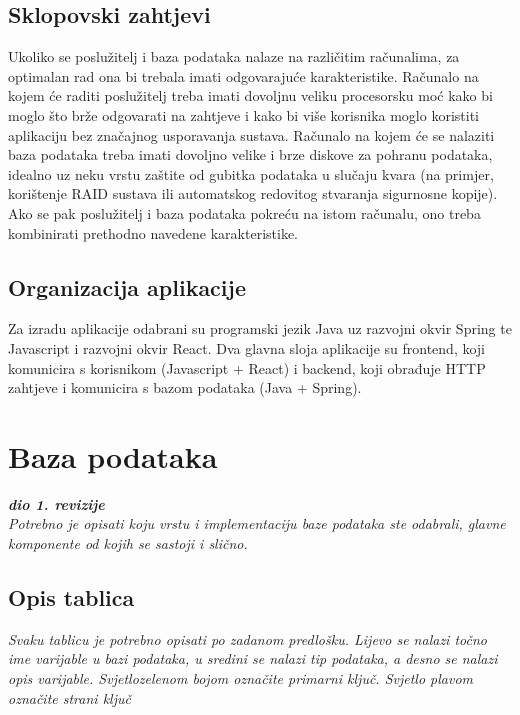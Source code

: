 			\subsection{Sklopovski zahtjevi}
				Ukoliko se poslužitelj i baza podataka nalaze na različitim računalima, za optimalan rad ona bi trebala imati odgovarajuće karakteristike. Računalo na kojem će raditi poslužitelj treba imati dovoljnu veliku procesorsku moć kako bi moglo što brže odgovarati na zahtjeve i kako bi više korisnika moglo koristiti aplikaciju bez značajnog usporavanja sustava. Računalo na kojem će se nalaziti baza podataka treba imati dovoljno velike i brze diskove za pohranu podataka, idealno uz neku vrstu zaštite od gubitka podataka u slučaju kvara (na primjer, korištenje RAID sustava ili automatskog redovitog stvaranja sigurnosne kopije). Ako se pak poslužitelj i baza podataka pokreću na istom računalu, ono treba kombinirati prethodno navedene karakteristike.
			\subsection{Organizacija aplikacije}
				Za izradu aplikacije odabrani su programski jezik Java uz razvojni okvir Spring te Javascript i razvojni okvir React. Dva glavna sloja aplikacije su frontend, koji komunicira s korisnikom (Javascript + React) i backend, koji obrađuje HTTP zahtjeve i komunicira s bazom podataka (Java + Spring).
				
				
		

		\section{Baza podataka}
			
			\textbf{\textit{dio 1. revizije}}\\
			
		\textit{Potrebno je opisati koju vrstu i implementaciju baze podataka ste odabrali, glavne komponente od kojih se sastoji i slično.}
		
			\subsection{Opis tablica}
			

				\textit{Svaku tablicu je potrebno opisati po zadanom predlošku. Lijevo se nalazi točno ime varijable u bazi podataka, u sredini se nalazi tip podataka, a desno se nalazi opis varijable. Svjetlozelenom bojom označite primarni ključ. Svjetlo plavom označite strani ključ}
				
